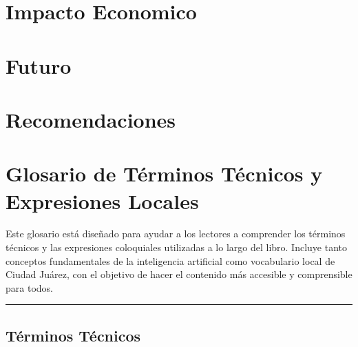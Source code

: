 \documentclass[
  10pt,
  letterpaper,
]{book}
\begin{document}

\chapter{Impacto Economico}\label{impacto-economico}


\chapter{Futuro}\label{futuro}


\chapter{Recomendaciones}\label{recomendaciones}


\chapter{\texorpdfstring{\textbf{Glosario de Términos Técnicos y
Expresiones
Locales}}{Glosario de Términos Técnicos y Expresiones Locales}}\label{glosario-de-tuxe9rminos-tuxe9cnicos-y-expresiones-locales}

Este glosario está diseñado para ayudar a los lectores a comprender los
términos técnicos y las expresiones coloquiales utilizadas a lo largo
del libro. Incluye tanto conceptos fundamentales de la inteligencia
artificial como vocabulario local de Ciudad Juárez, con el objetivo de
hacer el contenido más accesible y comprensible para todos.

\begin{center}\rule{0.5\linewidth}{0.5pt}\end{center}

\section{\texorpdfstring{\textbf{Términos
Técnicos}}{Términos Técnicos}}\label{tuxe9rminos-tuxe9cnicos}
\end{document}
